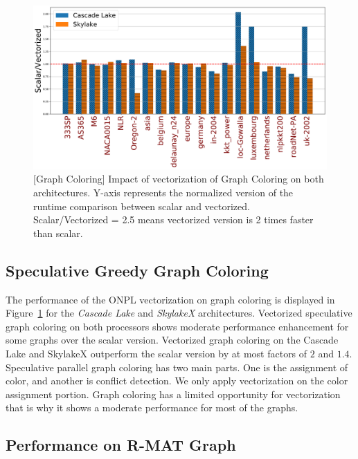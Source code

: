 \documentclass[default,iicol]{sn-jnl}%
\theoremstyle{thmstyleone}%
\theoremstyle{thmstyletwo}%
\theoremstyle{thmstylethree}%
\begin{document}
\begin{figure}[t]
  \centering
 \includegraphics[width=.48\linewidth]{figures/coloring/coloring_scalar_vs_vec_threads_cascade_48_skl_36.pdf}    
  \caption{[Graph Coloring] Impact of vectorization of Graph Coloring on both architectures. Y-axis represents the normalized version of 
  the runtime comparison between scalar and vectorized. Scalar/Vectorized = 2.5 means vectorized version is 2 
  times faster than scalar.}
   \label{fig:coloring_cascade_48_skl_36}
\end{figure}

\label{sec:perf}
\subsection{Speculative Greedy Graph Coloring}
The performance of the ONPL vectorization on graph coloring is displayed in Figure~\ref{fig:coloring_cascade_48_skl_36} 
for the \textit{Cascade Lake} and \textit{SkylakeX} architectures. Vectorized speculative graph coloring on both processors 
shows moderate performance enhancement for some graphs over the scalar version. Vectorized graph coloring on the 
Cascade Lake and SkylakeX outperform the scalar version by at most factors of $2$ and $1.4$. Speculative parallel graph coloring 
has two main parts. One is the assignment of color, and another is conflict detection. We only apply vectorization on the 
color assignment portion. Graph coloring has a limited opportunity for vectorization that is why it shows a moderate 
performance for most of the graphs. 

\subsection{Performance on R-MAT Graph}
\label{sec:rmat}
\end{document}
